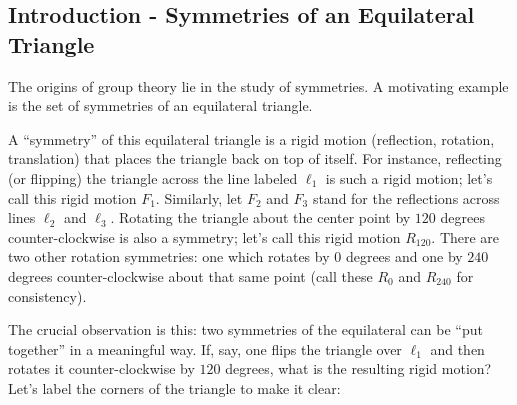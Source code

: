 \documentclass[12 pt]{article}
\begin{document}
\subsection{Introduction - Symmetries of an Equilateral Triangle}
The origins of group theory lie in the study of symmetries. A motivating example is the set of symmetries of an equilateral triangle.

\begin{center}
\end{center}

A ``symmetry'' of this equilateral triangle is a rigid motion (reflection, rotation, translation) that places the triangle back on top of itself. For instance, reflecting (or flipping) the triangle across the line labeled $\ell_1$ is such a rigid motion; let's call this rigid motion $F_1$. Similarly, let $F_2$ and $F_3$ stand for the reflections across lines $\ell_2$ and $\ell_3$. Rotating the triangle about the center point by $120$ degrees counter-clockwise is also a symmetry; let's call this rigid motion $R_{120}$. There are two other rotation symmetries: one which rotates by $0$ degrees and one by $240$ degrees counter-clockwise about that same point (call these $R_0$ and $R_{240}$ for consistency). 

The crucial observation is this: two symmetries of the equilateral can be ``put together'' in a meaningful way. If, say, one flips the triangle over $\ell_1$ and then rotates it counter-clockwise by $120$ degrees, what is the resulting rigid motion?  Let's label the corners of the triangle to make it clear:

\begin{center}
\end{center}
\end{document}
